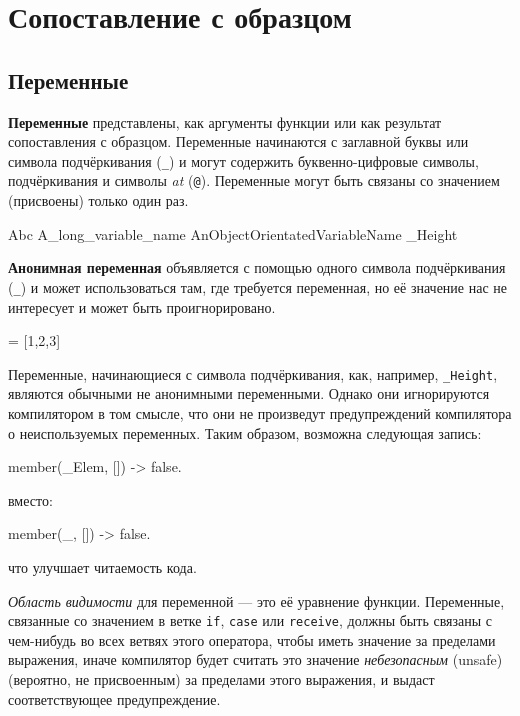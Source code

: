 \chapter{Сопоставление с образцом}
\label{patterns}

\section{Переменные}
\label{patterns:variables}

\textbf{Переменные} представлены, как аргументы функции или как результат 
сопоставления с образцом. Переменные начинаются с заглавной буквы или символа
подчёркивания (\texttt{\_}) и могут содержить буквенно-цифровые символы, 
подчёркивания и символы \emph{at} (\texttt{@}). Переменные могут быть связаны со 
значением (присвоены) только один раз.

\begin{erlang}
Abc
A_long_variable_name
AnObjectOrientatedVariableName
_Height
\end{erlang}

\textbf{Анонимная переменная} объявляется с помощью одного символа подчёркивания
(\texttt{\_}) и может использоваться там, где требуется переменная, но её значение
нас не интересует и может быть проигнорировано.

\begin{erlang}
[H|_] = [1,2,3]         %
\end{erlang}

Переменные, начинающиеся с символа подчёркивания, как, например, 
\texttt{\_Height}, являются обычными не анонимными переменными.  Однако они
игнорируются компилятором в том смысле, что они не произведут предупреждений
компилятора о неиспользуемых переменных.  Таким образом, возможна следующая
запись:

\begin{erlang}
member(_Elem, []) ->
    false.
\end{erlang}

вместо:

\begin{erlang}
member(_, []) ->
    false.
\end{erlang}

что улучшает читаемость кода.

\textit{Область видимости} для переменной --- это её уравнение функции.  
Переменные, связанные со значением в ветке \texttt{if}, \texttt{case} или 
\texttt{receive}, должны быть связаны с чем-нибудь во всех ветвях этого 
оператора, чтобы иметь значение за пределами выражения, иначе компилятор будет
считать это значение \textit{небезопасным} (unsafe) (вероятно, не присвоенным)
за пределами этого выражения, и выдаст соответствующее предупреждение.


